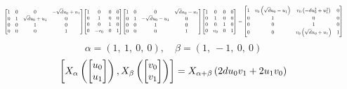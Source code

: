 \documentclass[11pt]{article}
\theoremstyle{definition}
\begin{document}
\[
\scaletoalign{\textwidth}{{\left[\begin{matrix}1 & 0 & 0 & - \sqrt{d} u_{0} + u_{1}\\0 & 1 & \sqrt{d} u_{0} + u_{1} & 0\\0 & 0 & 1 & 0\\0 & 0 & 0 & 1\end{matrix}\right]} {\left[\begin{matrix}1 & 0 & 0 & 0\\0 & 1 & 0 & 0\\0 & 0 & 1 & 0\\0 & - v_{0} & 0 & 1\end{matrix}\right]} {\left[\begin{matrix}1 & 0 & 0 & \sqrt{d} u_{0} - u_{1}\\0 & 1 & - \sqrt{d} u_{0} - u_{1} & 0\\0 & 0 & 1 & 0\\0 & 0 & 0 & 1\end{matrix}\right]} {\left[\begin{matrix}1 & 0 & 0 & 0\\0 & 1 & 0 & 0\\0 & 0 & 1 & 0\\0 & v_{0} & 0 & 1\end{matrix}\right]} = {\left[\begin{matrix}1 & v_{0} \left(\sqrt{d} u_{0} - u_{1}\right) & v_{0} \left(- d u_{0}^{2} + u_{1}^{2}\right) & 0\\0 & 1 & 0 & 0\\0 & 0 & 1 & 0\\0 & 0 & v_{0} \left(\sqrt{d} u_{0} + u_{1}\right) & 1\end{matrix}\right]}}
\]
\[
\alpha = \left( 1, \  1, \  0, \  0\right), \quad \beta = \left( 1, \  -1, \  0, \  0\right)
\]
\[
\scaletoalign{\textwidth}{\left[ X_{\alpha}\left(\left[\begin{matrix}u_{0}\\u_{1}\end{matrix}\right]\right), X_{\beta}\left(\left[\begin{matrix}v_{0}\\v_{1}\end{matrix}\right]\right) \right] = X_{\alpha + \beta}\left(2 d u_{0} v_{1} + 2 u_{1} v_{0}\right)}
\]
\end{document}
